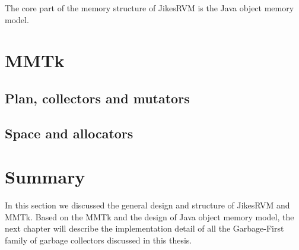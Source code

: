 The core part of the memory structure of JikesRVM is the Java object memory model.



\section{MMTk}
\label{sec:mmtk}

\subsection{Plan, collectors and mutators}

\subsection{Space and allocators}

\section{Summary}

In this section we discussed the general design and structure of JikesRVM and MMTk.
Based on the MMTk and the design of Java object memory model, the next chapter will
describe the implementation detail of all the Garbage-First family of garbage collectors
discussed in this thesis.

